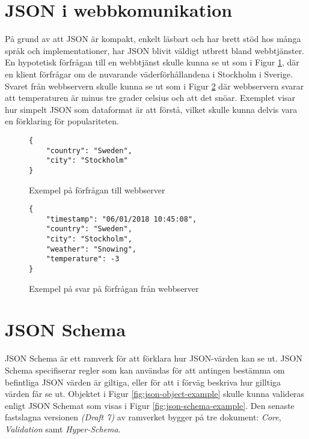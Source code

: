 \section{JSON i webbkomunikation}
\label{sec:teori:json-web}
På grund av att JSON är kompakt, enkelt läsbart och har brett stöd hos många språk och implementationer, har JSON blivit väldigt utbrett bland webbtjänster. En hypotetisk förfrågan till en webbtjänst skulle kunna se ut som i Figur \ref{fig:json-request-example}, där en klient förfrågar om de nuvarande väderförhållandena i Stockholm i Sverige. Svaret från webbservern skulle kunna se ut som i Figur \ref{fig:json-response-example} där webbservern svarar att temperaturen är minus tre grader celsius och att det snöar. Exemplet visar hur simpelt JSON som dataformat är att förstå, vilket skulle kunna delvis vara en förklaring för populariteten.

\begin{figure}
	\begin{verbatim}
{
	"country": "Sweden",
	"city": "Stockholm"
}
\end{verbatim}
	\vspace{-1.7em}
	\caption{Exempel på förfrågan till webbserver}
	\label{fig:json-request-example}
\end{figure}

\begin{figure}
	\begin{verbatim}
{
	"timestamp": "06/01/2018 10:45:08",
	"country": "Sweden",
	"city": "Stockholm",
	"weather": "Snowing",
	"temperature": -3
}
	\end{verbatim}
	\vspace{-1.7em}
	\caption{Exempel på svar på förfrågan från webbserver}
	\label{fig:json-response-example}
\end{figure}

\section{JSON Schema}
\label{sec:teori:schema}
JSON Schema är ett ramverk för att förklara hur JSON-värden kan se ut. JSON Schema specifiserar regler som kan användas för att antingen bestämma om befintliga JSON värden är giltiga, eller för att i förväg beskriva hur gilltiga värden får se ut. Objektet i Figur \ref{fig:json-object-example} skulle kunna valideras enligt JSON Schemat som visas i Figur \ref{fig:json-schema-example}. Den senaste fastslagna versionen \textit{(Draft 7)} av ramverket bygger på tre dokument: \textit{Core}, \textit{Validation} samt \textit{Hyper-Schema}. \cite{A.Wright,Andrews2018,Andrews2018a}

